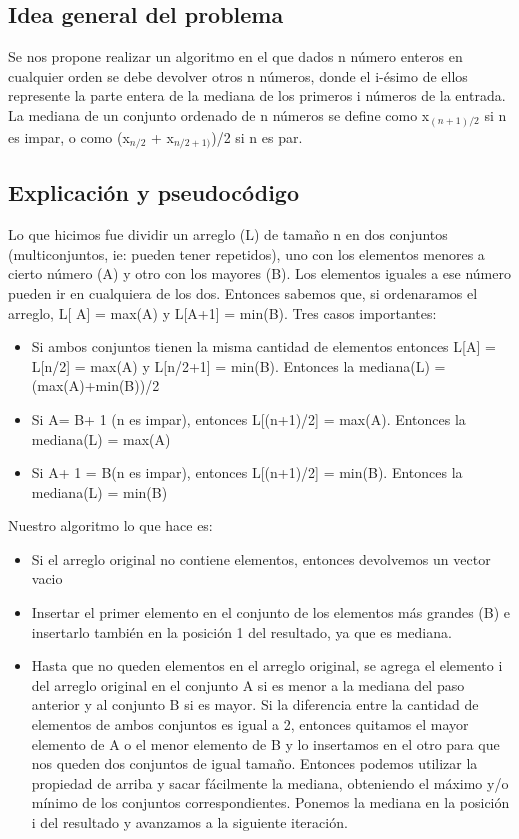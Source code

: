 \subsection{Idea general del problema}
Se nos propone realizar un algoritmo en el que dados n número enteros en cualquier orden se debe devolver otros n números, donde el i-ésimo de ellos represente la parte entera de la mediana de los primeros i números de la entrada.
La mediana de un conjunto ordenado de n números se define como x$_{(n+1)/2}$ si n es impar, o como (x$_{n/2}$ + x$_{n/2+1)}$)/2  si n es par.
\subsection{Explicación y pseudocódigo}

Lo que hicimos fue dividir un arreglo (L) de tamaño n en dos conjuntos (multiconjuntos, ie: pueden tener repetidos), uno con los elementos menores a cierto número (A) y otro con los mayores (B). Los elementos iguales a ese número pueden ir en cualquiera de los dos. Entonces sabemos que, si ordenaramos el arreglo, L[ \textbar A\textbar] = max(A) y L[\textbar A\textbar+1] = min(B). Tres casos importantes: 

\begin{itemize}
\item Si ambos conjuntos tienen la misma cantidad de elementos entonces L[\textbar A\textbar] = L[n/2] = max(A) y L[n/2+1] = min(B). Entonces la mediana(L) = (max(A)+min(B))/2
\item Si \textbar A\textbar = \textbar B\textbar + 1 (n es impar), entonces L[(n+1)/2] = max(A). Entonces la mediana(L) = max(A)
\item Si \textbar A\textbar + 1 = \textbar B\textbar (n es impar), entonces L[(n+1)/2] = min(B). Entonces la mediana(L) = min(B)
\end{itemize}


Nuestro algoritmo lo que hace es: 
\begin{itemize}
\item Si el arreglo original no contiene elementos, entonces devolvemos un vector vacio
\item Insertar el primer elemento en el conjunto de los elementos más grandes (B) e insertarlo también en la posición 1 del resultado, ya que es mediana.
\item Hasta que no queden elementos en el arreglo original, se agrega el elemento i del arreglo original en el conjunto A si es menor a la mediana del paso anterior y al conjunto B si es mayor. Si la diferencia entre la cantidad de elementos de ambos conjuntos es igual a 2, entonces quitamos el mayor elemento de A o el menor elemento de B y lo insertamos en el otro para que nos queden dos conjuntos de igual tamaño. Entonces podemos utilizar la propiedad de arriba y sacar fácilmente la mediana, obteniendo el máximo y/o mínimo de los conjuntos correspondientes. Ponemos la mediana en la posición i del resultado y avanzamos a la siguiente iteración.
\end{itemize}

